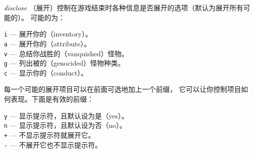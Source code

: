 \documentclass[a4paper, 10pt]{article}
\newcommand{\ib}[1]{\it #1 \hfill}
\begin{document}
\item[\ib{disclose}]
（展开）控制在游戏结束时各种信息是否展开的选项（默认为展开所有可能的）。
可能的为：

{\tt i} --- 展开你的\zhTransInventory（inventory）。\\
{\tt a} --- 展开你的\zhTransAttributes（attribute）。\\
{\tt v} --- 总结你战胜的（vanquished）怪物。\\
{\tt g} --- 列出被\zhTransGenocide{}的（genocided）怪物种类。\\
{\tt c} --- 显示你的\zhTransConduct（conduct）。

每一个可能的展开项目可以在前面可选地加上一个前缀，
它可以让你控制项目如何表现。下面是有效的前缀：

{\tt y} --- 显示提示符，且默认设为是（yes）。\\
{\tt n} --- 显示提示符，且默认设为否（no）。\\
{\tt +} --- 不显示提示符就展开它。\\
{\tt -} --- 不展开它也不显示提示符。
\end{document}
